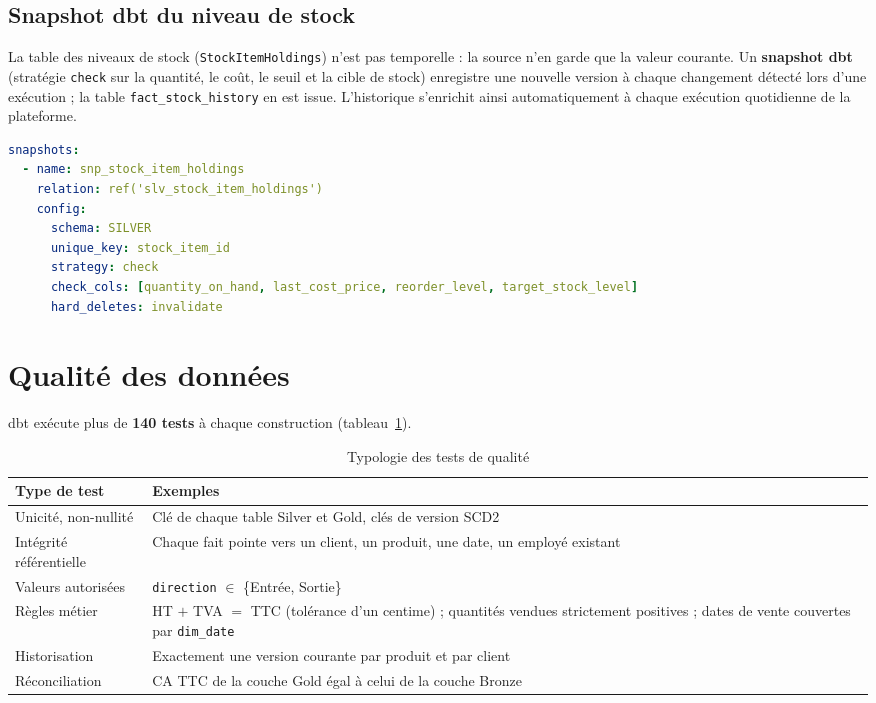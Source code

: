 \subsection{Snapshot dbt du niveau de stock}
La table des niveaux de stock (\texttt{StockItemHoldings}) n'est pas temporelle : la source n'en garde
que la valeur courante. Un \textbf{snapshot dbt} (stratégie \texttt{check} sur la quantité, le coût,
le seuil et la cible de stock) enregistre une nouvelle version à chaque changement détecté lors d'une
exécution ; la table \texttt{fact\_stock\_history} en est issue. L'historique s'enrichit ainsi
automatiquement à chaque exécution quotidienne de la plateforme.

\begin{lstlisting}[language=yaml, caption={Snapshot dbt du niveau de stock (\texttt{snapshots.yml})}, label=lst:snapshot]
snapshots:
  - name: snp_stock_item_holdings
    relation: ref('slv_stock_item_holdings')
    config:
      schema: SILVER
      unique_key: stock_item_id
      strategy: check
      check_cols: [quantity_on_hand, last_cost_price, reorder_level, target_stock_level]
      hard_deletes: invalidate
\end{lstlisting}

\section{Qualité des données}

dbt exécute plus de \textbf{140 tests} à chaque construction (tableau~\ref{tab:tests}).

\begin{table}[H]
\centering
\caption{Typologie des tests de qualité}
\label{tab:tests}
\begin{tabularx}{\linewidth}{@{}l X@{}}
\toprule
\textbf{Type de test} & \textbf{Exemples} \\
\midrule
Unicité, non-nullité & Clé de chaque table Silver et Gold, clés de version SCD2 \\
Intégrité référentielle & Chaque fait pointe vers un client, un produit, une date, un employé existant \\
Valeurs autorisées & \texttt{direction} $\in$ \{Entrée, Sortie\} \\
Règles métier & HT $+$ TVA $=$ TTC (tolérance d'un centime) ; quantités vendues strictement positives ;
                dates de vente couvertes par \texttt{dim\_date} \\
Historisation & Exactement une version courante par produit et par client \\
Réconciliation & CA TTC de la couche Gold égal à celui de la couche Bronze \\
\bottomrule
\end{tabularx}
\end{table}

